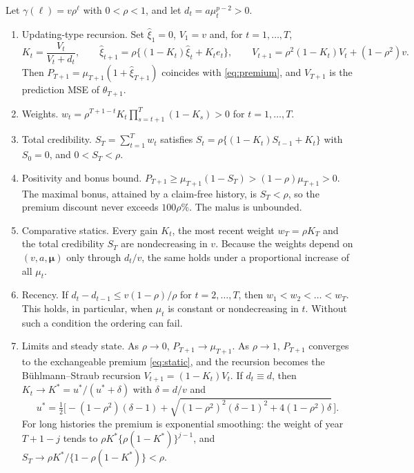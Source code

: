 \documentclass[mathematics,article,submit,moreauthors]{Definitions/mdpi}
\newcommand{\bmu}{\boldsymbol{\mu}}
\begin{document}
\begin{Proposition}\label{prop:kalman}
Let $\gamma(\ell)=v\rho^\ell$ with $0<\rho<1$, and let $d_t=a\mu_t^{p-2}>0$.
\begin{enumerate}
\item[(a)] \textup{Updating-type recursion.} Set $\hat\xi_1=0$, $V_1=v$ and, for $t=1,\dots,T$,
\[
K_t=\frac{V_t}{V_t+d_t},\qquad \hat\xi_{t+1}=\rho\{(1-K_t)\hat\xi_t+K_te_t\},\qquad V_{t+1}=\rho^2(1-K_t)V_t+(1-\rho^2)v .
\]
Then $P_{T+1}=\mu_{T+1}(1+\hat\xi_{T+1})$ coincides with \eqref{eq:premium}, and $V_{T+1}$ is the prediction MSE of $\theta_{T+1}$.
\item[(b)] \textup{Weights.} $w_t=\rho^{T+1-t}K_t\prod_{s=t+1}^{T}(1-K_s)>0$ for $t=1,\dots,T$.
\item[(c)] \textup{Total credibility.} $S_T=\sum_{t=1}^Tw_t$ satisfies $S_{t}=\rho\{(1-K_t)S_{t-1}+K_t\}$ with $S_0=0$, and $0<S_T<\rho$.
\item[(d)] \textup{Positivity and bonus bound.} $P_{T+1}\ge\mu_{T+1}(1-S_T)>(1-\rho)\mu_{T+1}>0$. The maximal bonus, attained by a claim-free history, is $S_T<\rho$, so the premium discount never exceeds $100\rho\%$. The malus is unbounded.
\item[(e)] \textup{Comparative statics.} Every gain $K_t$, the most recent weight $w_T=\rho K_T$ and the total credibility $S_T$ are nondecreasing in $v$. Because the weights depend on $(v,a,\bmu)$ only through $d_t/v$, the same holds under a proportional increase of all $\mu_t$.
\item[(f)] \textup{Recency.} If $d_t-d_{t-1}\le v(1-\rho)/\rho$ for $t=2,\dots,T$, then $w_1<w_2<\dots<w_T$. This holds, in particular, when $\mu_t$ is constant or nondecreasing in $t$. Without such a condition the ordering can fail.
\item[(g)] \textup{Limits and steady state.} As $\rho\to0$, $P_{T+1}\to\mu_{T+1}$. As $\rho\to1$, $P_{T+1}$ converges to the exchangeable premium \eqref{eq:static}, and the recursion becomes the B\"uhlmann--Straub recursion $V_{t+1}=(1-K_t)V_t$. If $d_t\equiv d$, then $K_t\to K^\ast=u^\ast/(u^\ast+\delta)$ with $\delta=d/v$ and
\[
u^\ast=\tfrac12\Big[-(1-\rho^2)(\delta-1)+\sqrt{(1-\rho^2)^2(\delta-1)^2+4(1-\rho^2)\delta}\,\Big].
\]
For long histories the premium is exponential smoothing: the weight of year $T+1-j$ tends to $\rho K^\ast\{\rho(1-K^\ast)\}^{j-1}$, and $S_T\to\rho K^\ast/\{1-\rho(1-K^\ast)\}<\rho$.
\end{enumerate}
\end{Proposition}
\end{document}
